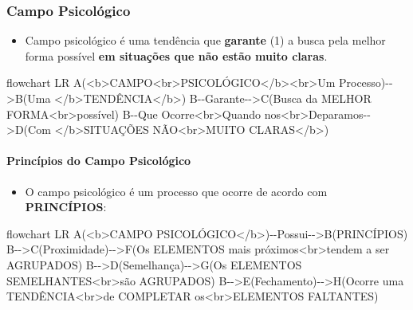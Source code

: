 \documentclass[
]{book}
\newenvironment{Shaded}{\begin{snugshade}}{\end{snugshade}}
\newcommand{\NormalTok}[1]{#1}
\providecommand{\tightlist}{%
  \setlength{\itemsep}{0pt}\setlength{\parskip}{0pt}}
\begin{document}
\hypertarget{campo-psicoluxf3gico}{%
\subsubsection{Campo Psicológico}\label{campo-psicoluxf3gico}}

\begin{itemize}
\tightlist
\item
  Campo psicológico é uma tendência que \textbf{garante} (1) a busca pela melhor forma possível \textbf{em situações que não estão muito claras}.
\end{itemize}

\begin{Shaded}
\begin{Highlighting}[]
\NormalTok{flowchart LR}
\NormalTok{A(\textless{}b\textgreater{}CAMPO\textless{}br\textgreater{}PSICOLÓGICO\textless{}/b\textgreater{}\textless{}br\textgreater{}Um Processo){-}{-}\textgreater{}B(Uma \textless{}/b\textgreater{}TENDÊNCIA\textless{}/b\textgreater{})}
\NormalTok{B{-}{-}Garante{-}{-}\textgreater{}C(Busca da MELHOR FORMA\textless{}br\textgreater{}possível)}
\NormalTok{B{-}{-}Que Ocorre\textless{}br\textgreater{}Quando nos\textless{}br\textgreater{}Deparamos{-}{-}\textgreater{}D(Com \textless{}/b\textgreater{}SITUAÇÕES NÃO\textless{}br\textgreater{}MUITO CLARAS\textless{}/b\textgreater{})}
\end{Highlighting}
\end{Shaded}

\hypertarget{princuxedpios-do-campo-psicoluxf3gico}{%
\paragraph{Princípios do Campo Psicológico}\label{princuxedpios-do-campo-psicoluxf3gico}}

\begin{itemize}
\tightlist
\item
  O campo psicológico é um processo que ocorre de acordo com \textbf{PRINCÍPIOS}:
\end{itemize}

\begin{Shaded}
\begin{Highlighting}[]
\NormalTok{flowchart LR}
\NormalTok{A(\textless{}b\textgreater{}CAMPO PSICOLÓGICO\textless{}/b\textgreater{}){-}{-}Possui{-}{-}\textgreater{}B(PRINCÍPIOS)}
\NormalTok{B{-}{-}\textgreater{}C(Proximidade){-}{-}\textgreater{}F(Os ELEMENTOS mais próximos\textless{}br\textgreater{}tendem a ser AGRUPADOS)}
\NormalTok{B{-}{-}\textgreater{}D(Semelhança){-}{-}\textgreater{}G(Os ELEMENTOS SEMELHANTES\textless{}br\textgreater{}são AGRUPADOS)}
\NormalTok{B{-}{-}\textgreater{}E(Fechamento){-}{-}\textgreater{}H(Ocorre uma TENDÊNCIA\textless{}br\textgreater{}de COMPLETAR os\textless{}br\textgreater{}ELEMENTOS FALTANTES)}
\end{Highlighting}
\end{Shaded}
\end{document}
